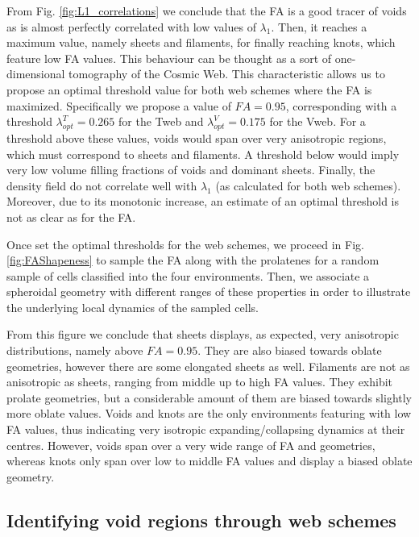 \documentclass[a4,useAMS,usenatbib,usegraphicx]{latex/mn2e}
\begin{document}
From Fig. \ref{fig:L1_correlations} we conclude that the FA is a good
tracer of voids as is almost perfectly correlated with low values of 
$\lambda_1$. Then, it reaches a maximum value, namely sheets and filaments, 
for finally reaching knots, which feature low FA values. This behaviour can 
be thought as a sort of one-dimensional tomography of the Cosmic Web. This
characteristic allows us to propose an optimal threshold value for both 
web schemes where the FA is maximized. Specifically we propose a value of 
$FA=0.95$, corresponding with a threshold $\lambda_{opt}^T = 0.265$ for
the Tweb and $\lambda_{opt}^V = 0.175$ for the Vweb.  For a threshold 
above these values, voids would span over very anisotropic regions, which 
must correspond to sheets and filaments. A threshold below would imply 
very low volume filling fractions of voids and dominant sheets. Finally, 
the density field do not correlate well with $\lambda_1$ (as calculated 
for both web schemes). Moreover, due to its monotonic increase, an estimate 
of an optimal threshold is not as clear as for the FA.


Once set the optimal thresholds for the web schemes, we proceed in Fig. 
\ref{fig:FAShapeness} to sample the FA along with the prolatenes for a 
random sample of cells classified into the four environments. Then, we 
associate a spheroidal geometry with different ranges of these properties
in order to illustrate the underlying local dynamics of the sampled cells.


From this figure we conclude that sheets displays, as expected, very 
anisotropic distributions, namely above $FA=0.95$. They are also biased 
towards oblate geometries, however there are some elongated sheets as 
well. Filaments are not as anisotropic as sheets, ranging from middle up 
to high FA values. They exhibit prolate geometries, but a considerable 
amount of them are biased towards slightly more oblate values. Voids and 
knots are the only environments featuring with low FA values, thus 
indicating very isotropic expanding/collapsing dynamics at their centres. 
However, voids span over a very wide range of FA and geometries, whereas 
knots only span over low to middle FA values and display a biased oblate 
geometry.


\subsection{Identifying void regions through web schemes}
\label{subsec:identification}
\end{document}
